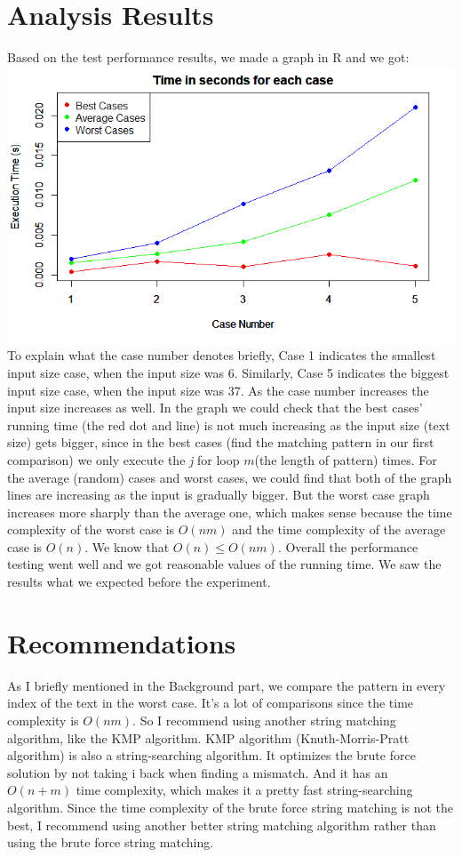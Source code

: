 \documentclass{article}
\begin{document}
\section{\textbf{Analysis Results}}
\indent Based on the test performance results, we made a graph in R and we got: \\
\includegraphics[scale = 0.65]{graph image.png} \\
\indent To explain what the case number denotes briefly, Case 1 indicates the smallest input size case, when the input size was 6. Similarly, Case 5 indicates the biggest input size case, when the input size was 37. As the case number increases the input size increases as well. In the graph we could check that the best cases' running time (the red dot and line) is not much increasing as the input size (text size) gets bigger, since in the best cases (find the matching pattern in our first comparison) we only execute the \textit{j} for loop $m$(the length of pattern) times. For the average (random) cases and worst cases, we could find that both of the graph lines are increasing as the input is gradually bigger. But the worst case graph increases more sharply than the average one, which makes sense because the time complexity of the worst case is $O(nm)$ and the time complexity of the average case is $O(n)$. We know that $O(n) \le O(nm)$. Overall the performance testing went well and we got reasonable values of the running time. We saw the results what we expected before the experiment.

\section{\textbf{Recommendations}}
\indent As I briefly mentioned in the Background part, we compare the pattern in every index of the text in the worst case. It's a lot of comparisons since the time complexity is $O(nm)$. So I recommend using another string matching algorithm, like the KMP algorithm. KMP algorithm (Knuth-Morris-Pratt algorithm) is also a string-searching algorithm. It optimizes the brute force solution by not taking i back when finding a mismatch. And it has an $O(n+m)$ time complexity, which makes it a pretty fast string-searching algorithm. Since the time complexity of the brute force string matching is not the best, I recommend using another better string matching algorithm rather than using the brute force string matching.
\end{document}
